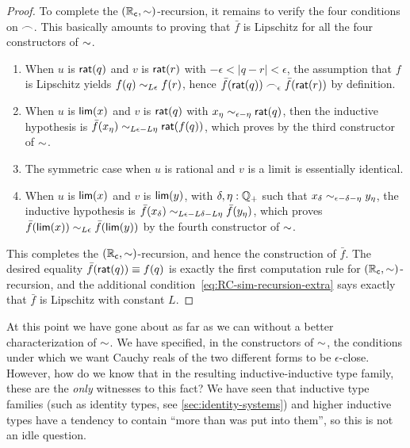\begin{proof}
  To complete the $(\mathbb{R}_\mathsf{c},\mathord\sim)$-recursion, it remains to verify the four conditions on $\frown$.
  This basically amounts to proving that $\bar f$ is Lipschitz for all the four constructors of $\mathord\sim$.
  \begin{enumerate}
  \item When $u$ is $\mathsf{rat}(q)$ and $v$ is $\mathsf{rat}(r)$ with $-\epsilon < |q-r| <\epsilon$, the assumption that $f$ is Lipschitz yields $f(q) \sim_{L\epsilon} f(r)$, hence $\bar{f}(\mathsf{rat}(q)) \frown_\epsilon \bar{f}(\mathsf{rat}(r))$ by definition.
  \item When $u$ is $\mathsf{lim}(x)$ and $v$ is $\mathsf{rat}(q)$ with $x_\eta \sim_{\epsilon - \eta} \mathsf{rat}(q)$, then the
      inductive hypothesis is $\bar{f}(x_\eta) \sim_{L \epsilon - L \eta} \mathsf{rat}(f(q))$, which proves
      by the third constructor of $\mathord\sim$.
  \item The symmetric case when $u$ is rational and $v$ is a limit is essentially identical.
  \item When $u$ is $\mathsf{lim}(x)$ and $v$ is $\mathsf{lim}(y)$, with $\delta, \eta : \mathbb{Q}_{+}$ such that $x_\delta \sim_{\epsilon - \delta - \eta} y_\eta$,
      the inductive hypothesis is $\bar{f}(x_\delta) \sim_{L \epsilon - L \delta - L \eta} \bar{f}(y_\eta)$, which proves $\bar{f}(\mathsf{lim}(x)) \sim_{L
        \epsilon} \bar{f}(\mathsf{lim}(y))$ by the fourth constructor of $\mathord\sim$.
  \end{enumerate}
  This completes the $(\mathbb{R}_\mathsf{c},\mathord\sim)$-recursion, and hence the construction of $\bar f$.
  The desired equality $\bar f(\mathsf{rat}(q))\equiv f(q)$ is exactly the first computation rule for $(\mathbb{R}_\mathsf{c},\mathord\sim)$-recursion, and the additional condition~\eqref{eq:RC-sim-recursion-extra} says exactly that $\bar f$ is Lipschitz with constant $L$.
\end{proof}

At this point we have gone about as far as we can without a better characterization of $\mathord\sim$.
We have specified, in the constructors of $\mathord\sim$, the conditions under which we want Cauchy reals of the two different forms to be $\epsilon$-close.
However, how do we know that in the resulting inductive-inductive type family, these are the \emph{only} witnesses to this fact?
We have seen that inductive type families (such as identity types, see \autoref{sec:identity-systems}) and higher inductive types have a tendency to contain ``more than was put into them'', so this is not an idle question.

